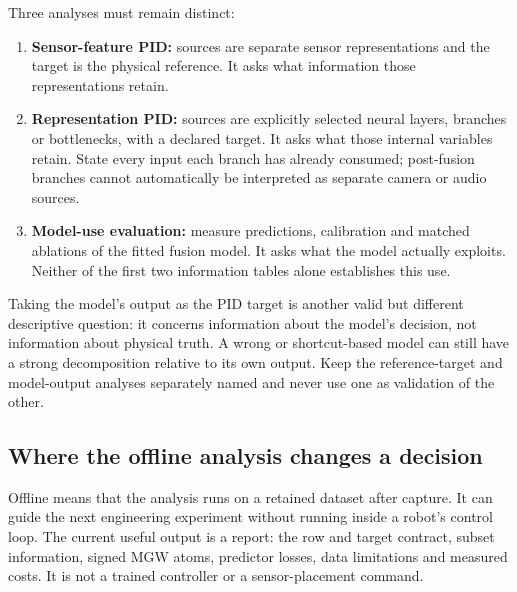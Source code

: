 \documentclass[11pt,a4paper]{article}
\providecommand{\tightlist}{\setlength{\itemsep}{0pt}\setlength{\parskip}{0pt}}
\begin{document}
Three analyses must remain distinct:

\begin{enumerate}
\def\labelenumi{\arabic{enumi}.}
\tightlist
\item
  \textbf{Sensor-feature PID:} sources are separate sensor representations and the target is the physical reference. It asks what information those representations retain.
\item
  \textbf{Representation PID:} sources are explicitly selected neural layers, branches or bottlenecks, with a declared target. It asks what those internal variables retain. State every input each branch has already consumed; post-fusion branches cannot automatically be interpreted as separate camera or audio sources.
\item
  \textbf{Model-use evaluation:} measure predictions, calibration and matched ablations of the fitted fusion model. It asks what the model actually exploits. Neither of the first two information tables alone establishes this use.
\end{enumerate}

Taking the model's output as the PID target is another valid but different descriptive question: it concerns information about the model's decision, not information about physical truth. A wrong or shortcut-based model can still have a strong decomposition relative to its own output. Keep the reference-target and model-output analyses separately named and never use one as validation of the other.

\par{}

\subsection{Where the offline analysis changes a decision}\label{where-the-offline-analysis-changes-a-decision}

Offline means that the analysis runs on a retained dataset after capture. It can guide the next engineering experiment without running inside a robot's control loop. The current useful output is a report: the row and target contract, subset information, signed MGW atoms, predictor losses, data limitations and measured costs. It is not a trained controller or a sensor-placement command.
\end{document}
